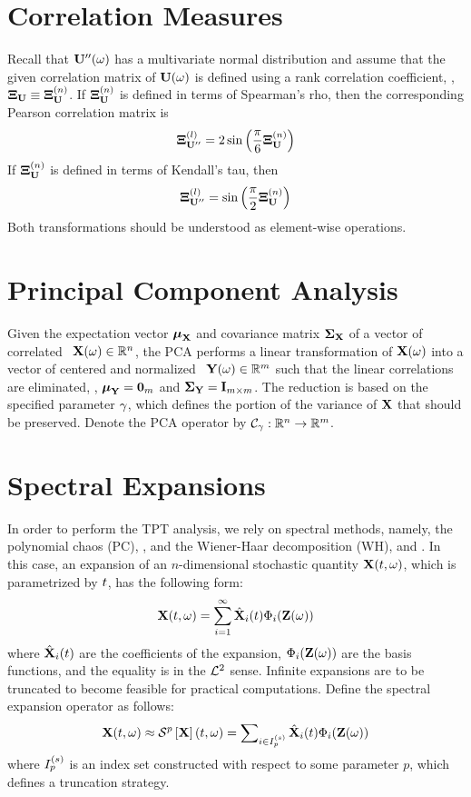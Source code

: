 \renewcommand{\thesection}{S\arabic{section}}
\renewcommand{\thetable}{S\arabic{table}}
\renewcommand{\thefigure}{S\arabic{figure}}
\setcounter{table}{0}
\setcounter{figure}{0}

\section{Correlation Measures} 
Recall that $\mathbf{U}''(\omega)$ has a multivariate normal distribution and assume that the given correlation matrix of $\mathbf{U}(\omega)$ is defined using a rank correlation coefficient, \ie, $\mathbf{\Xi}_{\mathbf{U}} \equiv \mathbf{\Xi}^{(n)}_{\mathbf{U}}$. If $\mathbf{\Xi}^{(n)}_{\mathbf{U}}$ is defined in terms of Spearman's rho, then the corresponding Pearson correlation matrix is
\[
  \mathbf{\Xi}^{(l)}_{\mathbf{U}''} = 2 \sin \left( \frac{\pi}{6} \mathbf{\Xi}^{(n)}_{\mathbf{U}} \right)
\]
If $\mathbf{\Xi}^{(n)}_{\mathbf{U}}$ is defined in terms of Kendall's tau, then
\[
  \mathbf{\Xi}^{(l)}_{\mathbf{U}''} = \sin \left( \frac{\pi}{2} \mathbf{\Xi}^{(n)}_{\mathbf{U}} \right)
\]
Both transformations should be understood as element-wise operations.

\section{Principal Component Analysis} 
Given the expectation vector $\boldsymbol{\mu}_{\mathbf{X}}$ and covariance matrix $\mathbf{\Sigma}_{\mathbf{X}}$ of a vector of correlated \rvs\ $\mathbf{X}(\omega) \in \mathbb{R}^n$, the PCA performs a linear transformation of $\mathbf{X}(\omega)$ into a vector of centered and normalized \rvs\ $\mathbf{Y}(\omega) \in \mathbb{R}^m$ such that the linear correlations are eliminated, \ie, $\boldsymbol{\mu}_{\mathbf{Y}} = \mathbf{0}_m$ and $\mathbf{\Sigma}_{\mathbf{Y}} = \mathbf{I}_{m \times m}$. The reduction is based on the specified parameter $\gamma$, which defines the portion of the variance of $\mathbf{X}$ that should be preserved. Denote the PCA operator by $\oPCA: \real^n \to \real^m$.

\section{Spectral Expansions} 
In order to perform the TPT analysis, we rely on spectral methods, namely, the polynomial chaos (PC), , and the Wiener-Haar decomposition (WH),  and . In this case, an expansion of an $n$-dimensional stochastic quantity $\mathbf{X}(t, \omega)$, which is parametrized by $t$, has the following form:
\[
  \mathbf{X}(t, \omega) = \sum_{i = 1}^\infty \hat{\mathbf{X}}_i(t) \Phi_i(\mathbf{Z}(\omega))
\]
where $\hat{\mathbf{X}}_i(t)$ are the coefficients of the expansion, $\Phi_i(\mathbf{Z}(\omega))$ are the basis functions, and the equality is in the $\mathcal{L}^{2}$ sense. Infinite expansions are to be truncated to become feasible for practical computations. Define the spectral expansion operator as follows:
\[
  \v{X}(\t, \o) \approx \oSE{p}{\v{X}}(\t, \o) = \sum\nolimits_{i \in \iExpansion_p} \generalCoeff{\v{X}}_i(\t) \generalBasis_i(\vZ(\o))
\]
where $I^{(s)}_p$ is an index set constructed with respect to some parameter $p$, which defines a truncation strategy.

